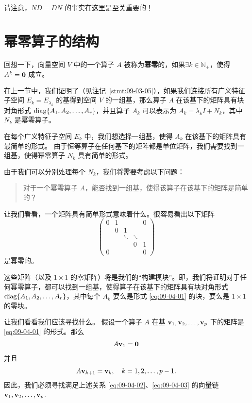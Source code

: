 请注意，$ND = DN$ 的事实在这里是至关重要的！

\section{幂零算子的结构}\label{sec:09-04}

回想一下，向量空间 $V$ 中的一个算子 $A$ 被称为\textbf{幂零}的，如果$\exists k \in \mathbb{N}_+$，使得  $A^k = \mathbf{0}$ 成立。

在上一节中，我们证明了（见注记~\ref{stmt:09-03-05}），如果我们连接所有广义特征子空间 $E_k = E_{\lambda_k}$ 的基得到空间 $V$ 的一组基，那么算子 $A$ 在该基下的矩阵具有块对角形式 $\operatorname{diag}\{A_1, A_2, \dots, A_r\}$，并且算子 $A_k$ 可以表示为 $A_k = \lambda_k I + N_k$，其中 $N_k$ 是幂零算子。

在每个广义特征子空间 $E_k$ 中，我们想选择一组基，使得 $A_k$ 在该基下的矩阵具有最简单的形式。
由于恒等算子在任何基下的矩阵都是单位矩阵，我们需要找到一组基，使得幂零算子 $N_k$ 具有简单的形式。

由于我们可以分别处理每个 $N_k$，我们将需要考虑以下问题：
\begin{quote}
    对于一个幂零算子 $A$，能否找到一组基，使得该算子在该基下的矩阵是简单的？
\end{quote}

让我们看看，一个矩阵具有简单形式意味着什么。很容易看出以下矩阵
\begin{equation}\label{eq:09-04-01}
\begin{pmatrix} 0 & 1 & & & 0 \\ & 0 & 1 & & \\ & & \ddots & \ddots & \\ & & & 0 & 1 \\ 0 & & & & 0 \end{pmatrix}
\end{equation}
是幂零的。

这些矩阵（以及 $1 \times 1$ 的零矩阵）将是我们的“构建模块”。即，我们将证明对于任何幂零算子，都可以找到一组基，使得算子在该基下的矩阵具有块对角形式 $\operatorname{diag}\{A_1, A_2, \dots, A_r\}$，其中每个 $A_k$ 要么是形式 \eqref{eq:09-04-01} 的块，要么是 $1 \times 1$ 的零块。

让我们看看我们应该寻找什么。
假设一个算子 $A$ 在基 $\mathbf{v}_1, \mathbf{v}_2, \dots, \mathbf{v}_p$ 下的矩阵是 \eqref{eq:09-04-01} 的形式。那么
\begin{equation}\label{eq:09-04-02}
A\mathbf{v}_1 = \mathbf{0}
\end{equation}
并且
\begin{equation}\label{eq:09-04-03}
A\mathbf{v}_{k+1} = \mathbf{v}_k, \quad k = 1, 2, \dots, p-1.
\end{equation}
因此，我们必须寻找满足上述关系 \eqref{eq:09-04-02}、\eqref{eq:09-04-03} 的向量链 $\mathbf{v}_1, \mathbf{v}_2, \dots, \mathbf{v}_p$.~


